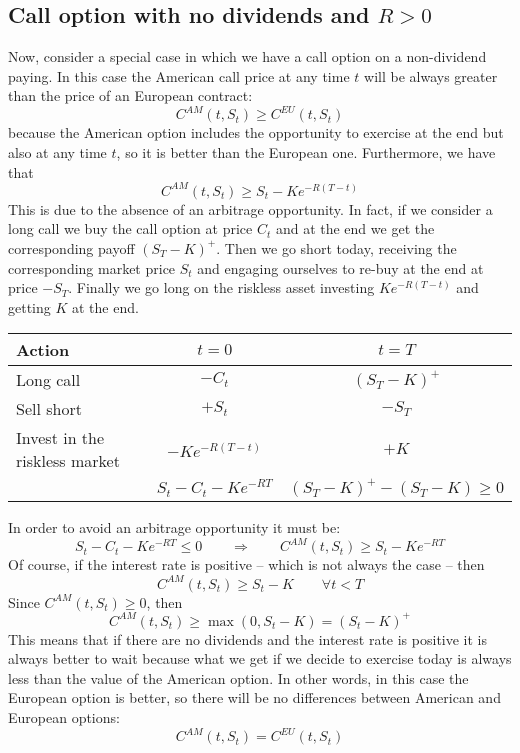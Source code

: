 \subsection{Call option with no dividends and \texorpdfstring{$R>0$}{R>0}}
Now, consider a special case in which we have a call option on a non-dividend paying. In this case the American call price at any time $t$ will be always greater than the price of an European contract:
\begin{equation*}
    C^{AM}(t,S_t)\ge C^{EU}(t,S_t)
\end{equation*}
because the American option includes the opportunity to exercise at the end but also at any time $t$, so it is better than the European one. Furthermore, we have that
\begin{equation*}
    C^{AM}(t,S_t) \ge S_t - Ke^{-R(T-t)}
\end{equation*}
This is due to the absence of an arbitrage opportunity. In fact, if we consider a long call we buy the call option at price $C_t$ and at the end we get the corresponding payoff $(S_T-K)^+$. Then we go short today, receiving the corresponding market price $S_t$ and engaging ourselves to re-buy at the end at price $-S_T$. Finally we go long on the riskless asset investing $Ke^{-R(T-t)}$ and getting $K$ at the end.
\begin{center}
    \begin{tabular}{lcc}\toprule
        Action & $t=0$ & $t=T$ \\\midrule
        Long call & $-C_t$ & $(S_T-K)^+$ \\
        Sell short & $+S_t$ & $-S_T$ \\
        Invest in the riskless market & $-Ke^{-R(T-t)}$ & $+K$ \\ \midrule\midrule
         & $S_t-C_t-Ke^{-RT}$ & $(S_T-K)^+-(S_T-K)\ge 0$ \\\bottomrule
    \end{tabular}
\end{center}
In order to avoid an arbitrage opportunity it must be:
\begin{equation*}
    S_t-C_t-Ke^{-RT} \le 0 \qquad\Rightarrow\qquad C^{AM}(t,S_t)\ge S_t-Ke^{-RT}
\end{equation*}
Of course, if the interest rate is positive -- which is not always the case -- then
\begin{equation*}
    C^{AM}(t,S_t) \ge S_t - K \qquad\forall t<T
\end{equation*}
Since $C^{AM}(t,S_t)\ge0$, then
\begin{equation*}
    C^{AM}(t,S_t)\ge \max(0,S_t-K)=(S_t-K)^+
\end{equation*}
This means that if there are no dividends and the interest rate is positive it is always better to wait because what we get if we decide to exercise today is always less than the value of the American option. In other words, in this case the European option is better, so there will be no differences between American and European options:
\begin{equation*}
    C^{AM}(t,S_t)=C^{EU}(t,S_t)
\end{equation*}

